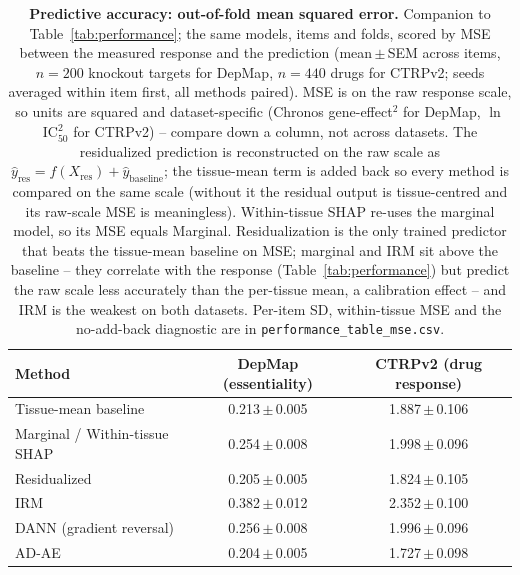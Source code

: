 \begin{table}[t]
  \centering
  \small
  \begin{tabular}{l c c}
    \toprule
    Method & DepMap (essentiality) & CTRPv2 (drug response) \\
    \midrule
    Tissue-mean baseline & 0.213\,$\pm$\,0.005 & 1.887\,$\pm$\,0.106 \\
    \midrule
    Marginal / Within-tissue SHAP & 0.254\,$\pm$\,0.008 & 1.998\,$\pm$\,0.096 \\
    Residualized & 0.205\,$\pm$\,0.005 & 1.824\,$\pm$\,0.105 \\
    IRM & 0.382\,$\pm$\,0.012 & 2.352\,$\pm$\,0.100 \\
    DANN (gradient reversal) & 0.256\,$\pm$\,0.008 & 1.996\,$\pm$\,0.096 \\
    AD-AE & 0.204\,$\pm$\,0.005 & 1.727\,$\pm$\,0.098 \\
    \bottomrule
  \end{tabular}
  \caption{\textbf{Predictive accuracy: out-of-fold mean squared error.} Companion to Table~\ref{tab:performance}; the same models, items and folds, scored by MSE between the measured response and the prediction (mean\,$\pm$\,SEM across items, $n=200$ knockout targets for DepMap, $n=440$ drugs for CTRPv2; seeds averaged within item first, all methods paired). MSE is on the raw response scale, so units are squared and dataset-specific (Chronos gene-effect$^2$ for DepMap, $\ln$IC$_{50}^{2}$ for CTRPv2) -- compare down a column, not across datasets. The residualized prediction is reconstructed on the raw scale as $\hat y_{\mathrm{res}}=f(X_{\mathrm{res}})+\hat y_{\mathrm{baseline}}$; the tissue-mean term is added back so every method is compared on the same scale (without it the residual output is tissue-centred and its raw-scale MSE is meaningless). Within-tissue SHAP re-uses the marginal model, so its MSE equals Marginal. Residualization is the only trained predictor that beats the tissue-mean baseline on MSE; marginal and IRM sit above the baseline -- they correlate with the response (Table~\ref{tab:performance}) but predict the raw scale less accurately than the per-tissue mean, a calibration effect -- and IRM is the weakest on both datasets. Per-item SD, within-tissue MSE and the no-add-back diagnostic are in \texttt{performance\_table\_mse.csv}.}
  \label{tab:performance_mse}
\end{table}
